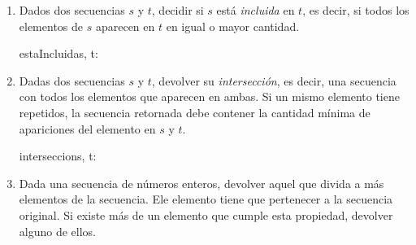 \begin{enumerate}[label=\alph*)]
      \item Dados dos secuencias $s$ y $t$, decidir si $s$ está \textit{incluida} en $t$, es decir, si todos los elementos de $s$ aparecen en $t$ en igual o mayor cantidad.

            \begin{proc}{estaIncluida}{\In s, t: \TLista{\ent}}{\bool}

            \end{proc}

      \item Dadas dos secuencias $s$ y $t$, devolver su \textit{intersección}, es decir, una secuencia con todos los elementos que aparecen en ambas. Si un mismo elemento tiene repetidos, la secuencia retornada debe contener la cantidad mínima de apariciones del elemento en $s$ y $t$.

            \begin{proc}{interseccion}{\In s, t: \TLista{\ent}}{\TLista{\ent}}



            \end{proc}

      \item Dada una secuencia de números enteros, devolver aquel que divida a más elementos de la secuencia. Ele elemento tiene que pertenecer a la secuencia original. Si existe más de un elemento que cumple esta propiedad, devolver alguno de ellos.


\end{enumerate}
